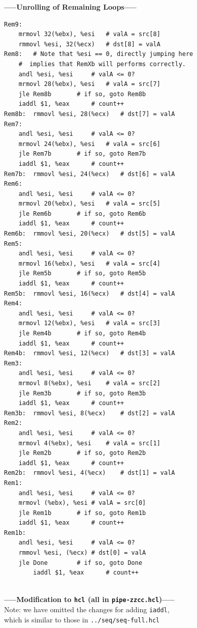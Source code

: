\documentclass[12pt,a4paper]{article}
\begin{document}
\begin{center}
        \textbf{-----Unrolling of Remaining Loops-----}\\
\end{center}
\begin{lstlisting}
Rem9:
	mrmovl 32(%ebx), %esi	# valA = src[8]
	rmmovl %esi, 32(%ecx)	# dst[8] = valA
Rem8:	# Note that %esi == 0, directly jumping here
	#  implies that RemXb will performs correctly.
	andl %esi, %esi		# valA <= 0?
	mrmovl 28(%ebx), %esi	# valA = src[7]
	jle Rem8b		# if so, goto Rem8b
	iaddl $1, %eax		# count++
Rem8b:	rmmovl %esi, 28(%ecx)	# dst[7] = valA
Rem7:	
	andl %esi, %esi		# valA <= 0?
	mrmovl 24(%ebx), %esi	# valA = src[6]
	jle Rem7b		# if so, goto Rem7b
	iaddl $1, %eax		# count++
Rem7b:	rmmovl %esi, 24(%ecx)	# dst[6] = valA
Rem6:	
	andl %esi, %esi		# valA <= 0?
	mrmovl 20(%ebx), %esi	# valA = src[5]
	jle Rem6b		# if so, goto Rem6b
	iaddl $1, %eax		# count++
Rem6b:	rmmovl %esi, 20(%ecx)	# dst[5] = valA
Rem5:	
	andl %esi, %esi		# valA <= 0?
	mrmovl 16(%ebx), %esi	# valA = src[4]
	jle Rem5b		# if so, goto Rem5b
	iaddl $1, %eax		# count++
Rem5b:	rmmovl %esi, 16(%ecx)	# dst[4] = valA
Rem4:	
	andl %esi, %esi		# valA <= 0?
	mrmovl 12(%ebx), %esi	# valA = src[3]
	jle Rem4b		# if so, goto Rem4b
	iaddl $1, %eax		# count++
Rem4b:	rmmovl %esi, 12(%ecx)	# dst[3] = valA
Rem3:	
	andl %esi, %esi		# valA <= 0?
	mrmovl 8(%ebx), %esi	# valA = src[2]
	jle Rem3b		# if so, goto Rem3b
	iaddl $1, %eax		# count++
Rem3b:	rmmovl %esi, 8(%ecx)	# dst[2] = valA
Rem2:	
	andl %esi, %esi		# valA <= 0?
	mrmovl 4(%ebx), %esi	# valA = src[1]
	jle Rem2b		# if so, goto Rem2b
	iaddl $1, %eax		# count++
Rem2b:	rmmovl %esi, 4(%ecx)	# dst[1] = valA
Rem1:	
	andl %esi, %esi		# valA <= 0?
	mrmovl (%ebx), %esi	# valA = src[0]
	jle Rem1b		# if so, goto Rem1b
	iaddl $1, %eax		# count++
Rem1b:	
	andl %esi, %esi		# valA <= 0?
	rmmovl %esi, (%ecx)	# dst[0] = valA
	jle Done		# if so, goto Done
        iaddl $1, %eax		# count++
        
\end{lstlisting}
\begin{center}
        {\color{blue}\textbf{-----Modification to \texttt{hcl} (all in \texttt{pipe-zzcc.hcl})-----}}\\
        Note: we have omitted the changes for adding \texttt{iaddl}, \\which is similar to those in \texttt{../seq/seq-full.hcl}
\end{center}
\end{document}
